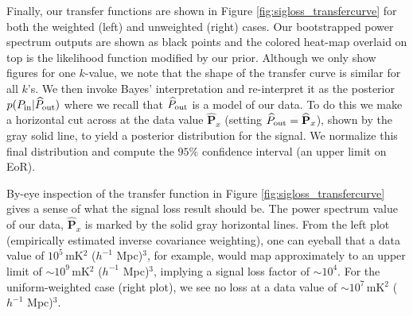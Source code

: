 \documentclass[preprint2,numberedappendix,tighten]{aastex6}  %
\newcommand{\phat}{\widehat{\mathbf{p}}}
\begin{document}
Finally, our transfer functions are shown in Figure \ref{fig:sigloss_transfercurve} for both the weighted (left) and unweighted (right) cases. Our bootstrapped power spectrum outputs are shown as black points and the colored heat-map overlaid on top is the likelihood function modified by our prior. Although we only show figures for one $k$-value, we note that 
the shape of the transfer curve is similar for all $k$'s. We then invoke Bayes' interpretation and re-interpret it as the posterior $p(P_{\rm in}|\widehat{P}_{\rm out})$ where we recall that $\widehat{P}_{\rm out}$ is a model of our data. To do this we make a horizontal cut across at the data value $\widehat{\textbf{P}}_{x}$ (setting $\widehat{P}_{\rm out} = \widehat{\textbf{P}}_{x}$), shown by the gray solid line, to yield a posterior distribution for the signal. We normalize this final distribution and compute the $95\%$ confidence interval (an upper limit on EoR).


By-eye inspection of the transfer function in Figure \ref{fig:sigloss_transfercurve} gives a sense of what the signal loss result should be. The power spectrum value of our data, $
\widehat{\textbf{P}}_{x}$ is marked by the solid gray horizontal lines. From the left plot (empirically estimated inverse covariance weighting), one can eyeball that a data value of $10^{5} \,$mK$^{2}$ ($h^{-1}$ Mpc)$^{3}$, for example, would map approximately to an upper limit of $\sim10^{9} \,$mK$^{2}$ ($h^{-1}$ Mpc)$^{3}$, implying a signal loss factor of $\sim10^{4}$. For the uniform-weighted case (right plot), we see no loss at a data value of $\sim10^{7} \,$mK$^{2}$ ($h^{-1}$ Mpc)$^{3}$.
\end{document}
